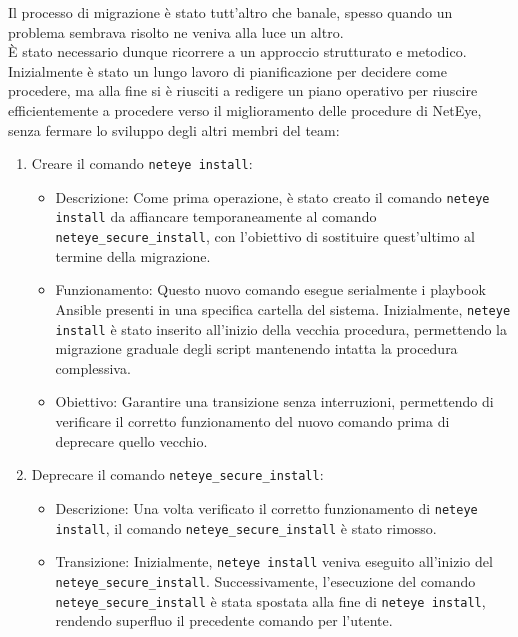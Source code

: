 Il processo di migrazione è stato tutt'altro che banale, spesso quando un
problema sembrava risolto ne veniva alla luce un altro.\\ È stato necessario
dunque ricorrere a un approccio strutturato e metodico.\\ Inizialmente è stato
un lungo lavoro di pianificazione per decidere come procedere, ma alla fine si è
riusciti a redigere un piano operativo per riuscire efficientemente a procedere verso
il miglioramento delle procedure di NetEye, senza fermare lo sviluppo degli
altri membri del team:
\begin{enumerate}
  \item Creare il comando \texttt{neteye install}:
    \begin{itemize}
      \item Descrizione: Come prima operazione, è stato creato il comando \texttt{neteye
        install} da affiancare temporaneamente al comando \texttt{neteye\_secure\_install},
        con l'obiettivo di sostituire quest'ultimo al termine della migrazione.

      \item Funzionamento: Questo nuovo comando esegue serialmente i playbook
        Ansible presenti in una specifica cartella del sistema. Inizialmente,
        \texttt{neteye install} è stato inserito all'inizio della vecchia procedura,
        permettendo la migrazione graduale degli script mantenendo intatta la
        procedura complessiva.

      \item Obiettivo: Garantire una transizione senza interruzioni, permettendo
        di verificare il corretto funzionamento del nuovo comando prima di deprecare
        quello vecchio.
    \end{itemize}

  \item Deprecare il comando \texttt{neteye\_secure\_install}:
    \begin{itemize}
      \item Descrizione: Una volta verificato il corretto funzionamento di
        \texttt{neteye install}, il comando \texttt{neteye\_secure\_install} è stato
        rimosso.

      \item Transizione: Inizialmente, \texttt{neteye install} veniva eseguito
        all'inizio del \texttt{neteye\_secure\_install}. Successivamente, l'esecuzione
        del comando \texttt{neteye\_secure\_install} è stata spostata alla fine
        di \texttt{neteye install}, rendendo superfluo il precedente comando per
        l'utente.


\end{itemize}
\end{enumerate}
